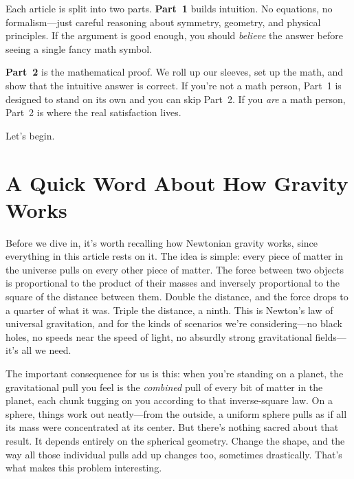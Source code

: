 \documentclass[11pt, letterpaper]{article}
\begin{document}
Each article is split into two parts. \textbf{Part~1} builds intuition. No equations, no formalism---just careful reasoning about symmetry, geometry, and physical principles. If the argument is good enough, you should \textit{believe} the answer before seeing a single fancy math symbol.

\textbf{Part~2} is the mathematical proof. We roll up our sleeves, set up the math, and show that the intuitive answer is correct. If you're not a math person, Part~1 is designed to stand on its own and you can skip Part~2. If you \textit{are} a math person, Part~2 is where the real satisfaction lives.

Let's begin.



\section*{A Quick Word About How Gravity Works}

Before we dive in, it's worth recalling how Newtonian gravity works, since everything in this article rests on it. The idea is simple: every piece of matter in the universe pulls on every other piece of matter. The force between two objects is proportional to the product of their masses and inversely proportional to the square of the distance between them. Double the distance, and the force drops to a quarter of what it was. Triple the distance, a ninth. This is Newton's law of universal gravitation, and for the kinds of scenarios we're considering---no black holes, no speeds near the speed of light, no absurdly strong gravitational fields---it's all we need.

The important consequence for us is this: when you're standing on a planet, the gravitational pull you feel is the \textit{combined} pull of every bit of matter in the planet, each chunk tugging on you according to that inverse-square law. On a sphere, things work out neatly---from the outside, a uniform sphere pulls as if all its mass were concentrated at its center. But there's nothing sacred about that result. It depends entirely on the spherical geometry. Change the shape, and the way all those individual pulls add up changes too, sometimes drastically. That's what makes this problem interesting.

\end{document}
